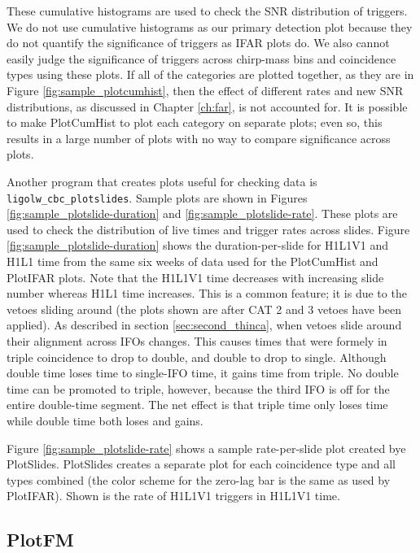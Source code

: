 These cumulative histograms are used to check the \ac{SNR} distribution of triggers. We do not use cumulative histograms as our primary detection plot because they do not quantify the significance of triggers as IFAR plots do. We also cannot easily judge the significance of triggers across chirp-mass bins and coincidence types using these plots. If all of the categories are plotted together, as they are in Figure \ref{fig:sample_plotcumhist}, then the effect of different rates and new \ac{SNR} distributions, as discussed in Chapter \ref{ch:far}, is not accounted for. It is possible to make PlotCumHist to plot each category on separate plots; even so, this results in a large number of plots with no way to compare significance across plots.

Another program that creates plots useful for checking data is \verb|ligolw_cbc_plotslides|. Sample plots are shown in Figures \ref{fig:sample_plotslide-duration} and \ref{fig:sample_plotslide-rate}. These plots are used to check the distribution of live times and trigger rates across slides. Figure \ref{fig:sample_plotslide-duration} shows the duration-per-slide for H1L1V1 and H1L1 time from the same six weeks of data used for the PlotCumHist and PlotIFAR plots. Note that the H1L1V1 time decreases with increasing slide number whereas H1L1 time increases. This is a common feature; it is due to the vetoes sliding around (the plots shown are after CAT 2 and 3 vetoes have been applied). As described in section \ref{sec:second_thinca}, when vetoes slide around their alignment across \acp{IFO} changes. This causes times that were formely in triple coincidence to drop to double, and double to drop to single. Although double time loses time to single-\ac{IFO} time, it gains time from triple. No double time can be promoted to triple, however, because the third \ac{IFO} is off for the entire double-time segment. The net effect is that triple time only loses time while double time both loses and gains.

Figure \ref{fig:sample_plotslide-rate} shows a sample rate-per-slide plot created bye PlotSlides. PlotSlides creates a separate plot for each coincidence type and all types combined (the color scheme for the zero-lag bar is the same as used by PlotIFAR). Shown is the rate of H1L1V1 triggers in H1L1V1 time.

\subsection{PlotFM}

